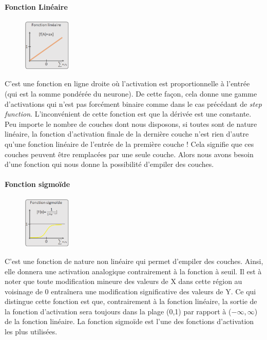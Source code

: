 \paragraph*{Fonction Linéaire}
\begin{figure}
    \vspace{-1 cm}
    \includegraphics[width=0.2\textwidth]{img/linfunc.png}
    \vspace{-1 cm}
\end{figure}
C’est une fonction en ligne droite où l'activation est proportionnelle à l'entrée (qui est la somme pondérée du neurone). 
De cette façon, cela donne une gamme d'activations qui n'est pas forcément binaire comme dans le cas précédant de \textit{step function}.
L'inconvénient de cette fonction est que la dérivée est une constante. Peu importe le nombre de couches dont nous disposons, si toutes sont de nature linéaire, la fonction d'activation finale de la dernière couche n'est rien d'autre qu'une fonction linéaire de l'entrée de la première couche ! Cela signifie que ces couches peuvent être remplacées par une seule couche. Alors nous avons besoin d’une fonction qui nous donne la possibilité d'empiler des couches.


\paragraph*{Fonction sigmoïde}
\begin{figure}
    \vspace{-1 cm}
    \includegraphics[width=0.2\textwidth]{img/segfunc.png}
    \vspace{-1 cm}
\end{figure}
C’est une fonction de nature non linéaire qui permet d'empiler des couches. Ainsi, elle donnera une activation analogique contrairement à la fonction à seuil. Il est à noter que toute modification mineure des valeurs de X dans cette région au voisinage de 0 entraînera une modification significative des valeurs de Y. Ce qui distingue cette fonction est que, contrairement à la fonction linéaire, la sortie de la fonction d'activation sera toujours dans la plage (0,1) par rapport à ($-\infty, \infty$) de la fonction linéaire. La fonction sigmoïde est l’une des fonctions d’activation les plus utilisées. 

